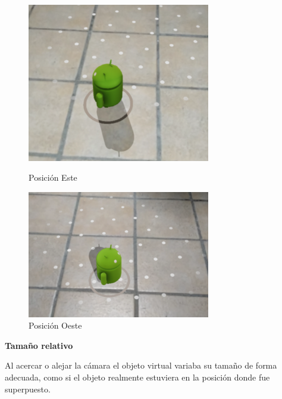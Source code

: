 \begin{figure}[!htbp]
	\begin{minipage}{0.48\textwidth}
		\centering
		\includegraphics[width=8cm]{desarrollo/secciones/pruebas/motog6/img/ESTE.png}
		\caption{Posición Este}
		\label{fig:motog6norte}
	\end{minipage}\hfill
	\begin{minipage}{0.48\textwidth}
		\centering
		\includegraphics[width=8cm]{desarrollo/secciones/pruebas/motog6/img/OESTE.png}
		\caption{Posición Oeste}
		\label{fig:motog6oeste}
	\end{minipage}\hfill
\end{figure}

\textbf{Tamaño relativo} \par
Al acercar o alejar la cámara el objeto virtual variaba su tamaño de forma adecuada, como si el objeto realmente estuviera en la posición donde fue superpuesto.


